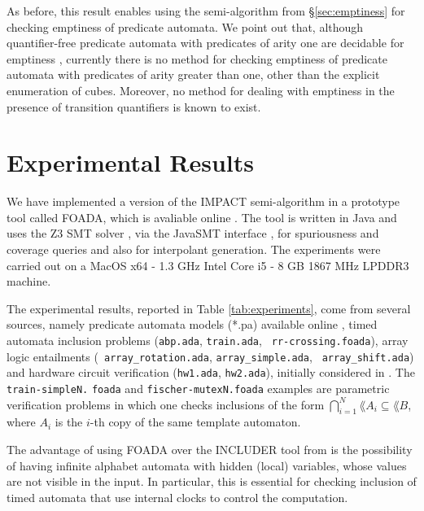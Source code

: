 As before, this result enables using the
semi-algorithm from \S\ref{sec:emptiness} for checking emptiness of
predicate automata.  We point out that, although quantifier-free
predicate automata with predicates of arity one are decidable for
emptiness \cite{Farzan15}, currently there is no method for checking
emptiness of predicate automata with predicates of arity greater than
one, other than the explicit enumeration of cubes. Moreover, no method
for dealing with emptiness in the presence of transition quantifiers
is known to exist.
\fi

\vspace*{-0.5\baselineskip}
\section{Experimental Results}
\vspace*{-0.5\baselineskip}

We have implemented a version of the IMPACT semi-algorithm
\cite{McMillan06} in a prototype tool called FOADA, which is avaliable
online \cite{foada}. The tool is written in Java and uses the Z3 SMT
solver \cite{z3}, via the JavaSMT interface \cite{javasmt}, for
spuriousness and coverage queries and also for interpolant generation.
The experiments were carried out on a MacOS x64 - 1.3 GHz Intel Core
i5 - 8 GB 1867 MHz LPDDR3 machine.

The experimental results, reported in Table \ref{tab:experiments},
come from several sources, namely predicate automata models (*.pa)
\cite{Farzan15,Farzan16} available online \cite{pa}, timed automata
inclusion problems ({\tt abp.ada}, {\tt train.ada}, {\tt
  rr-crossing.foada}), array logic entailments ({\tt
  array\_rotation.ada}, {\tt array\_simple.ada}, {\tt
  array\_shift.ada}) and hardware circuit verification ({\tt hw1.ada},
{\tt hw2.ada}), initially considered in \cite{IosifRV16}. The {\tt
  train-simpleN.} {\tt foada} and {\tt fischer-mutexN.foada} examples are
parametric verification problems in which one checks inclusions of the
form $\bigcap_{i=1}^N\lang{A_i} \subseteq \lang{B}$, where $A_i$ is
the $i$-th copy of the same template automaton.

The advantage of using FOADA over the INCLUDER \cite{includer} tool
from \cite{IosifRV16} is the possibility of having infinite alphabet
automata with hidden (local) variables, whose values are not visible
in the input. In particular, this is essential for checking inclusion
of timed automata that use internal clocks to control the computation.

